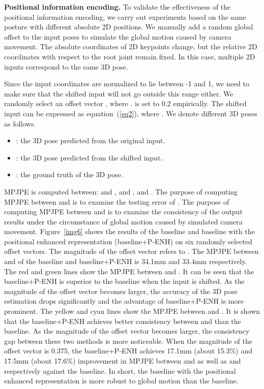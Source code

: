 \documentclass[sigconf]{acmart}
\begin{document}
\textbf{Positional information encoding.} To validate the effectiveness of the positional information encoding, we carry out experiments based on the same posture with different absolute 2D positions. We manually add a random global offset to the input poses to simulate the global motion caused by camera movement. The absolute coordinates of 2D keypoints change, but the relative 2D coordinates with respect to the root joint remain fixed. In this case, multiple 2D inputs correspond to the same 3D pose. 

Since the input coordinates are normalized to lie between -1 and 1, we need to make sure that the shifted input will not go outside this range either. We randomly select an offset vector , where .  is set to 0.2 empirically. The shifted input can be expressed as equation~(\ref{eq2}), where . We denote different 3D poses as follows.
\begin{itemize}
 \item : the 3D pose predicted from the original input.
 \item : the 3D pose predicted from the shifted input.
 \item : the ground truth of the 3D pose.

\end{itemize}
MPJPE is computed between:  and ,  and ,  and . The purpose of computing MPJPE between  and  is to examine the testing error of . The purpose of computing MPJPE between  and  is to examine the consistency of the output results under the circumstance of global motion caused by simulated camera movement. Figure~\ref{img6} shows the results of the baseline and baseline with the positional enhanced representation (baseline+P-ENH) on six randomly selected offset vectors. The magnitude of the offset vector refers to . The MPJPE between  and  of the baseline and baseline+P-ENH is 34.1mm and 33.4mm respectively. The red and green lines show the MPJPE between  and . It can be seen that the baseline+P-ENH is superior to the baseline when the input is shifted. As the magnitude of the offset vector becomes larger, the accuracy of the 3D pose estimation drops significantly and the advantage of baseline+P-ENH is more prominent. The yellow and cyan lines show the MPJPE between  and . It is shown that the baseline+P-ENH achieves better consistency between  and  than the baseline. As the magnitude of the offset vector becomes larger, the consistency gap between these two methods is more noticeable. When the magnitude of the offset vector is 0.375, the baseline+P-ENH achieves 17.1mm (about 15.3\%) and 17.5mm (about 17.6\%) improvement in MPJPE between  and  as well as  and  respectively against the baseline. In short, the baseline with the positional enhanced representation is more robust to global motion than the baseline. \\
\end{document}
